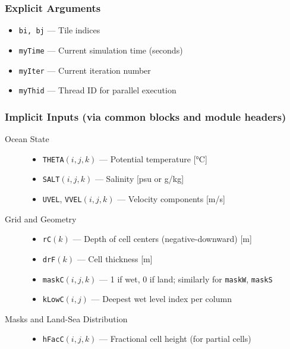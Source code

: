 \documentclass[11pt, a4paper]{article}
\begin{document}
\subsubsection{Explicit Arguments}

\begin{itemize}
    \item \texttt{bi, bj} — Tile indices
    \item \texttt{myTime} — Current simulation time (seconds)
    \item \texttt{myIter} — Current iteration number
    \item \texttt{myThid} — Thread ID for parallel execution
\end{itemize}

\subsubsection{Implicit Inputs (via common blocks and module headers)}

\begin{description}
    \item[Ocean State] 
    \begin{itemize}
        \item \texttt{THETA}$(i,j,k)$ — Potential temperature [°C]
        \item \texttt{SALT}$(i,j,k)$ — Salinity [psu or g/kg]
        \item \texttt{UVEL}, \texttt{VVEL}$(i,j,k)$ — Velocity components [m/s]
    \end{itemize}
    
    \item[Grid and Geometry]
    \begin{itemize}
        \item \texttt{rC}$(k)$ — Depth of cell centers (negative-downward) [m]
        \item \texttt{drF}$(k)$ — Cell thickness [m]
        \item \texttt{maskC}$(i,j,k)$ — 1 if wet, 0 if land; similarly for \texttt{maskW}, \texttt{maskS}
        \item \texttt{kLowC}$(i,j)$ — Deepest wet level index per column
    \end{itemize}
    
    \item[Masks and Land-Sea Distribution]
    \begin{itemize}
        \item \texttt{hFacC}$(i,j,k)$ — Fractional cell height (for partial cells)
    \end{itemize}
\end{description}
\end{document}
